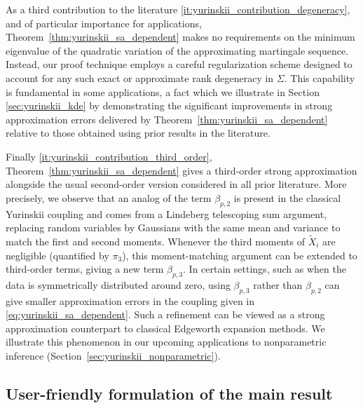\documentclass[11pt,lof]{puthesis}
\theoremstyle{break}
\theoremstyle{proof}
\begin{document}
As a third contribution to the literature
\ref{it:yurinskii_contribution_degeneracy}, and
of particular importance for applications,
Theorem~\ref{thm:yurinskii_sa_dependent} makes
no requirements on the minimum eigenvalue of the quadratic variation of the
approximating martingale sequence. Instead, our proof technique employs a
careful regularization scheme designed to account for any such exact or
approximate rank degeneracy in $\Sigma$. This capability is fundamental in some
applications, a fact which we illustrate in Section \ref{sec:yurinskii_kde} by
demonstrating the significant improvements in strong approximation errors
delivered by Theorem~\ref{thm:yurinskii_sa_dependent} relative to those
obtained using
prior results in the literature.

Finally \ref{it:yurinskii_contribution_third_order},
Theorem~\ref{thm:yurinskii_sa_dependent} gives
a third-order strong approximation alongside the usual second-order
version considered in all prior literature.
More precisely, we observe that an analog of the term
$\beta_{p,2}$ is present in the
classical Yurinskii coupling and comes from a Lindeberg
telescoping sum argument,
replacing random variables by Gaussians with the same mean
and variance to match the first and second moments.
Whenever the third moments of $\tilde X_i$ are negligible
(quantified by $\pi_3$), this moment-matching argument can be extended to
third-order terms, giving a new term $\beta_{p,3}$.
In certain settings, such as when the data is symmetrically
distributed around zero, using $\beta_{p,3}$ rather than $\beta_{p,2}$
can give smaller approximation errors in the coupling given in
\eqref{eq:yurinskii_sa_dependent}.
Such a refinement can be viewed as a strong approximation counterpart
to classical Edgeworth expansion methods.
We illustrate this phenomenon in our
upcoming applications to nonparametric inference
(Section~\ref{sec:yurinskii_nonparametric}).

\subsection{User-friendly formulation of the main result}%
\end{document}
